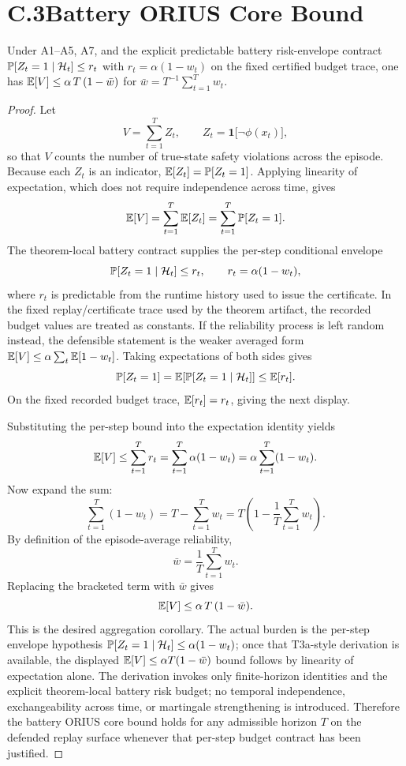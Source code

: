 \section{C.3\quad Battery ORIUS Core Bound}\label{sec:proof-core-bound}
\begin{theorem}[restated]
Under A1--A5, A7, and the explicit predictable battery risk-envelope contract
$\operatorname{\mathbb{P}}[Z_t=1\mid\mathcal{H}_t]\le r_t$ with
$r_t=\alpha(1-w_t)$ on the fixed certified budget trace, one has
$\mathbb{E}[V]\le\alpha\,T\,(1-\bar{w})$ for
$\bar w=T^{-1}\sum_{t=1}^T w_t$.
\end{theorem}
\begin{proof}
Let
\[
  V = \sum_{t=1}^{T} Z_t,
  \qquad
  Z_t = \mathbf{1}\!\bigl[\lnot \phi(x_t)\bigr],
\]
so that $V$ counts the number of true-state safety violations across the
episode.  Because each $Z_t$ is an indicator, $\mathbb{E}[Z_t]=\operatorname{\mathbb{P}}[Z_t=1]$.
Applying linearity of expectation, which does not require independence across
time, gives
\[
  \mathbb{E}[V] = \sum_{t=1}^{T}\mathbb{E}[Z_t] = \sum_{t=1}^{T}\operatorname{\mathbb{P}}[Z_t=1].
\]
The theorem-local battery contract supplies the per-step conditional envelope
\[
  \operatorname{\mathbb{P}}[Z_t=1\mid\mathcal{H}_t] \le r_t,
  \qquad
  r_t=\alpha(1-w_t),
\]
where $r_t$ is predictable from the runtime history used to issue the
certificate.  In the fixed replay/certificate trace used by the theorem
artifact, the recorded budget values are treated as constants.  If the
reliability process is left random instead, the defensible statement is the
weaker averaged form $\mathbb{E}[V]\le\alpha\sum_t\mathbb{E}[1-w_t]$.
Taking expectations of both sides gives
\[
  \operatorname{\mathbb{P}}[Z_t=1]
  =
  \mathbb{E}[\operatorname{\mathbb{P}}[Z_t=1\mid\mathcal{H}_t]]
  \le
  \mathbb{E}[r_t].
\]
On the fixed recorded budget trace, \(\mathbb{E}[r_t]=r_t\), giving the next display.

Substituting the per-step bound into the expectation identity yields
\[
  \mathbb{E}[V]
  \le \sum_{t=1}^{T} r_t
  = \sum_{t=1}^{T} \alpha(1-w_t)
  = \alpha \sum_{t=1}^{T}(1-w_t).
\]
Now expand the sum:
\[
  \sum_{t=1}^{T}(1-w_t)
  = T - \sum_{t=1}^{T} w_t
  = T\left(1 - \frac{1}{T}\sum_{t=1}^{T} w_t\right).
\]
By definition of the episode-average reliability,
\[
  \bar{w} = \frac{1}{T}\sum_{t=1}^{T} w_t.
\]
Replacing the bracketed term with $\bar{w}$ gives
\[
  \mathbb{E}[V] \le \alpha\,T\,(1-\bar{w}).
\]
This is the desired aggregation corollary.  The actual burden is the
per-step envelope hypothesis
$\operatorname{\mathbb{P}}[Z_t=1\mid\mathcal{H}_t]\le\alpha(1-w_t)$; once that T3a-style
derivation is available, the displayed $\mathbb{E}[V]\le\alpha T(1-\bar w)$ bound
follows by linearity of expectation alone.  The derivation invokes only
finite-horizon identities and the explicit theorem-local battery risk
budget; no temporal independence, exchangeability across time, or martingale
strengthening is introduced.  Therefore the battery ORIUS core bound holds for
any admissible horizon $T$ on the defended replay surface whenever that
per-step budget contract has been justified.
\qedhere
\end{proof}

